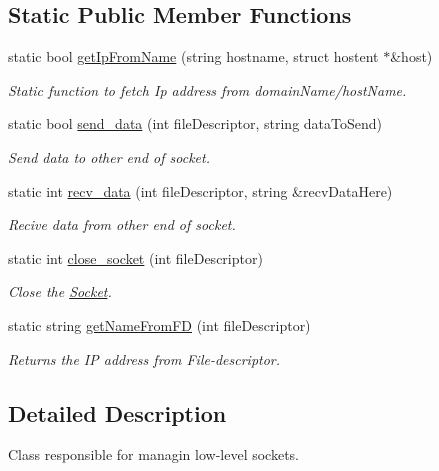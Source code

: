 \subsection*{Static Public Member Functions}
\begin{DoxyCompactItemize}
\item 
static bool \hyperlink{classSocket_a47696700f9178bb87ef800cb477ecacc}{get\+Ip\+From\+Name} (string hostname, struct hostent $\ast$\&host)
\begin{DoxyCompactList}\small\item\em Static function to fetch Ip address from domain\+Name/host\+Name. \end{DoxyCompactList}\item 
static bool \hyperlink{classSocket_a6b9394cf7656ec2f7ae86d57374379ca}{send\+\_\+data} (int file\+Descriptor, string data\+To\+Send)
\begin{DoxyCompactList}\small\item\em Send data to other end of socket. \end{DoxyCompactList}\item 
static int \hyperlink{classSocket_a76ba0cc2ab002c701fe8cbab31f95589}{recv\+\_\+data} (int file\+Descriptor, string \&recv\+Data\+Here)
\begin{DoxyCompactList}\small\item\em Recive data from other end of socket. \end{DoxyCompactList}\item 
static int \hyperlink{classSocket_a42c17ec1faed733a261a9160a45aa733}{close\+\_\+socket} (int file\+Descriptor)
\begin{DoxyCompactList}\small\item\em Close the \hyperlink{classSocket}{Socket}. \end{DoxyCompactList}\item 
static string \hyperlink{classSocket_a02ab07fcadca4429f50dcfebd7e63e9a}{get\+Name\+From\+FD} (int file\+Descriptor)
\begin{DoxyCompactList}\small\item\em Returns the IP address from File-\/descriptor. \end{DoxyCompactList}\end{DoxyCompactItemize}


\subsection{Detailed Description}
Class responsible for managin low-\/level sockets. 

